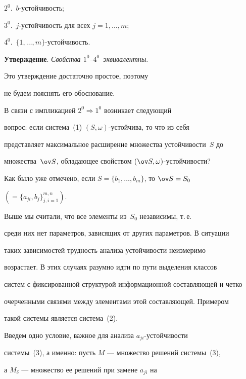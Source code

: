 $2^0.$~$b$-устойчивость;


$3^0.$~$j$-устойчивость для всех $j=1,\dotsc,m$;


$4^0.$~$\{1,\dotsc,m\}$-устойчивость.


\medskip





{\bf Утверждение}. {\it Свойства $1^0$--$4^0$\ эквивалентны}.


\medskip





\noindent Это утверждение достаточно простое, поэтому


не будем пояснять его обоснование.





В связи с импликацией $2^0\Rightarrow 1^0$ возникает следующий


вопрос: если система~(1)\; $(S,\omega)$-устойчива, то что из себя


представляет максимальное расширение множества устойчивости~$S$ до


множества~$\ov S$, обладающее свойством $(\ov S,\omega)$-устойчивости?


Как было уже отмечено, если $S=\{b_1,\dotsc,b_m\}$, то $\ov S=S_0$


$(=\{a_{ji},b_j\}_{j,i=1}^{m,n})$.





Выше мы считали, что все элементы из~$S_0$ независимы, т.\,е.


среди них нет параметров, зависящих от других параметров. В ситуации


таких зависимостей трудность анализа устойчивости неизмеримо


возрастает. В этих случаях разумно идти по пути выделения классов


систем с фиксированной структурой информационной составляющей и четко


очерченными связями между элементами этой составляющей. Примером


такой системы является система~(2).





Введем одно условие, важное для анализа $a_{ji}$-устойчивости


системы~(3), а именно: пусть $M$ --- множество решений системы~(3),


а $M_{\delta}$ --- множество ее решений при замене $a_{ji}$ на


